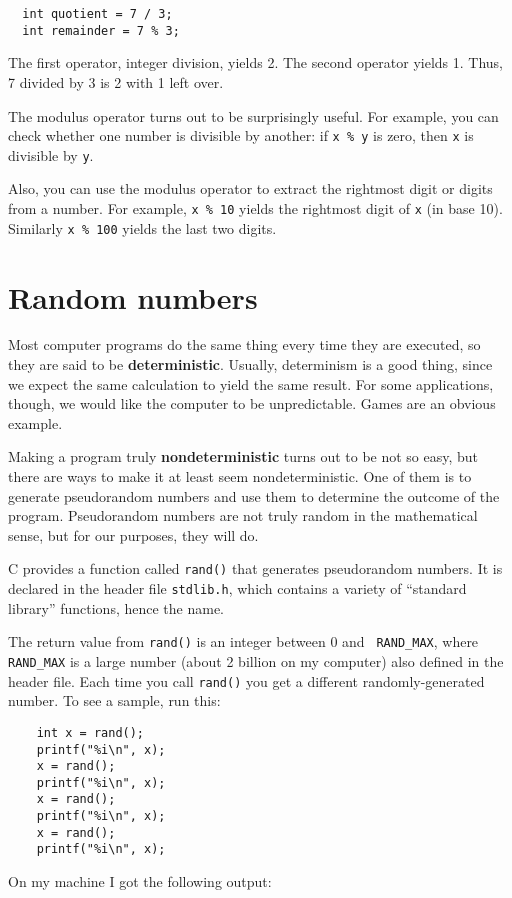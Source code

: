 \begin{verbatim}
  int quotient = 7 / 3;
  int remainder = 7 % 3;
\end{verbatim}
%
The first operator, integer division, yields 2.  The second
operator yields 1.  Thus, 7 divided by 3 is 2 with 1 left over.

The modulus operator turns out to be surprisingly useful.  For
example, you can check whether one number is divisible by
another: if {\tt x \% y} is zero, then {\tt x} is divisible
by {\tt y}.

Also, you can use the modulus operator to extract the rightmost
digit or digits from a number.  For example, {\tt x \% 10} yields
the rightmost digit of {\tt x} (in base 10).  Similarly
{\tt x \% 100} yields the last two digits.


\section{Random numbers}
\label{Random numbers}
\label{random}
\label{pseudorandom}
Most computer programs do the same thing every time they are executed,
so they are said to be {\bf deterministic}.  Usually, determinism is a
good thing, since we expect the same calculation to yield the same
result.  For some applications, though, we would like the
computer to be unpredictable.  Games are an obvious example.

Making a program truly {\bf nondeterministic} turns out to be not
so easy, but there are ways to make it at least seem
nondeterministic.  One of them is to generate {pseudorandom} numbers and
use them to determine the outcome of the program.
Pseudorandom numbers
are not truly random in the mathematical sense, but 
for our purposes, they will do.


C provides a function called {\tt rand()} that generates
pseudorandom numbers.  It is declared in the
header file {\tt stdlib.h}, which contains a variety of ``standard
library'' functions, hence the name.

The return value from {\tt rand()} is an integer between 0 and {\tt
	RAND\_MAX}, where {\tt RAND\_MAX} is a large number (about 2 billion
on my computer) also defined in the header file.  Each time you call
{\tt rand()} you get a different randomly-generated number.  To see a
sample, run this:

\begin{verbatim}
 	int x = rand();
 	printf("%i\n", x);
 	x = rand();
 	printf("%i\n", x);
 	x = rand();
 	printf("%i\n", x);
 	x = rand();
 	printf("%i\n", x);
\end{verbatim}
%
On my machine I got the following output:

